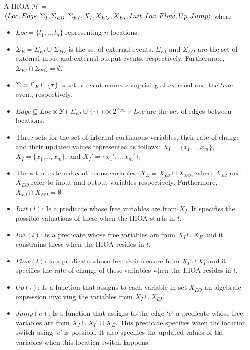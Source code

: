 \begin{definition}
  A \acf{HIOA} \newline $\mathcal{H}$ =
  $\langle Loc, Edge, \Sigma_I, \Sigma_{EO}, \Sigma_{EI}, X_I, X_{EO},
  X_{EI}, \linebreak Init, Inv, Flow, Up, Jump\rangle$ where
  \begin{itemize}
  \item $Loc=\{l_1,..,l_n\}$ representing $n$ locations.
  \item $\Sigma_{E} = \Sigma_{EI} \cup \Sigma_{EO}$ is the set of
    external events. $\Sigma_{EI}$ and $\Sigma_{EO}$ are the set of
    external input and external output events,
    respectively. Furthermore,
    \mbox{$\Sigma_{EI} \cap \Sigma_{EO} = \emptyset$}.
  \item $\Sigma=\Sigma_{E} \cup \{\tau\}$ is set of event names
    comprising of external and the $true$ event, respectively.
  \item
    $Edge \subseteq Loc \times \mathcal{B}(\Sigma_{EI} \cup \{\tau\})
    \times 2^{\Sigma_{EO}} \times Loc$
    are the set of edges between locations.
  \item Three sets for the set of internal continuous variables, their
    rate of change and their updated values represented as follows:
    $X_I=\{x_1,.., x_m\}$, $\dot{X_I}=\{\dot{x_1},.., \dot{x_m}\}$, and
    $X_I'=\{x_{1}',.., x_{m}'\}$.
  \item The set of external continuous variables:
    \mbox{$X_E = X_{EI} \cup X_{EO}$}, where $X_{EI}$ and $X_{EO}$ refer to 
    input and output variables respectively. Furthermore,
    \mbox{$X_{EI} \cap X_{EO} = \emptyset$}.
  \item $Init(l)$: Is a predicate whose free variables are from
    $X_{I}$. It specifies the possible valuations of these when the HIOA
    starts in $l$.
  \item $Inv(l)$: Is a predicate whose free variables are from
    \mbox{$X_I \cup X_{E}$} and it constrains these when the HIOA
    resides in $l$.
  \item $Flow(l)$: Is a predicate whose free variables are from
    $X_I \cup \dot{X_I}$ and it specifies the rate of change of these
    variables when the HIOA resides in $l$.
  \item $Up(l)$: Is a function that assigns to each variable in set
    $X_{EO}$ an algebraic expression involving the variables from \mbox{$X_{I} 
    \cup X_{EI}$}.
  \item $Jump(e)$: Is a function that assigns to the edge `$e$' a
    predicate whose free variables are from $X_I \cup X_I' \cup X_E$.
    This predicate specifies when the location switch using `$e$' is
    possible. It also specifies the updated values of the variables when
    this location switch happens.
  \end{itemize}
  \label{def:ha}
\end{definition}

